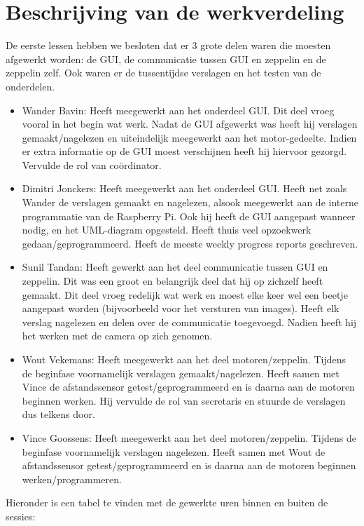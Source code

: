 \documentclass[eind]{penoverslag}
\begin{document}
\section{Beschrijving van de werkverdeling}
De eerste lessen hebben we besloten dat er 3 grote delen waren die moesten afgewerkt worden: de GUI, de communicatie tussen GUI en zeppelin en de zeppelin zelf. Ook waren er de tussentijdse verslagen en het testen van de onderdelen. \\
\begin{itemize}
\item Wander Bavin: Heeft meegewerkt aan het onderdeel GUI. Dit deel vroeg vooral in het begin wat werk. Nadat de GUI afgewerkt was heeft hij verslagen gemaakt/nagelezen en uiteindelijk meegewerkt aan het motor-gedeelte. Indien er extra informatie op de GUI moest verschijnen heeft hij hiervoor gezorgd. Vervulde de rol van co\"ordinator.
\item Dimitri Jonckers: Heeft meegewerkt aan het onderdeel GUI. Heeft net zoals Wander de verslagen gemaakt en nagelezen, alsook meegewerkt aan de interne programmatie van de Raspberry Pi. Ook hij heeft de GUI aangepast wanneer nodig, en het UML-diagram opgesteld. Heeft thuis veel opzoekwerk gedaan/geprogrammeerd. Heeft de meeste weekly progress reports geschreven.
\item Sunil Tandan: Heeft gewerkt aan het deel communicatie tussen GUI en zeppelin. Dit was een groot en belangrijk deel dat hij op zichzelf heeft gemaakt. Dit deel vroeg redelijk wat werk en moest elke keer wel een beetje aangepast worden (bijvoorbeeld voor het versturen van images). Heeft elk verslag nagelezen en delen over de communicatie toegevoegd. Nadien heeft hij het werken met de camera op zich genomen.
\item Wout Vekemans: Heeft meegewerkt aan het deel motoren/zeppelin. Tijdens de beginfase voornamelijk verslagen gemaakt/nagelezen. Heeft samen met Vince de afstandssensor getest/geprogrammeerd en is daarna aan de motoren beginnen werken. Hij vervulde de rol van secretaris en stuurde de verslagen dus telkens door.
\item Vince Goossens: Heeft meegewerkt aan het deel motoren/zeppelin. Tijdens de beginfase voornamelijk verslagen nagelezen. Heeft samen met Wout de afstandssensor getest/geprogrammeerd en is daarna aan de motoren beginnen werken/programmeren.
\end{itemize}

Hieronder is een tabel te vinden met de gewerkte uren binnen en buiten de sessies: \\
\end{document}
